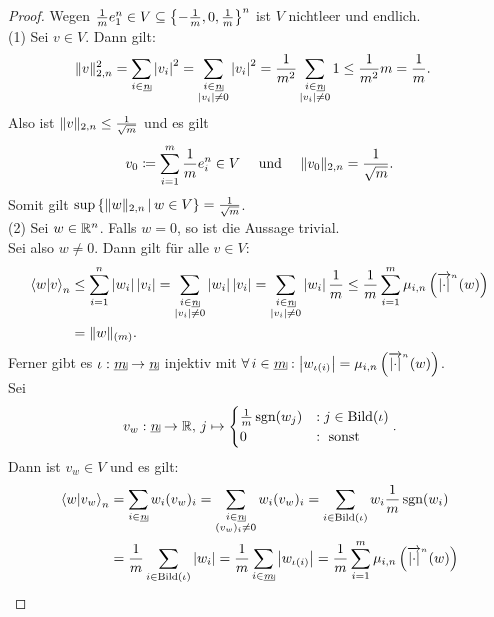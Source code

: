 \begin{proof}
Wegen $\frac 1 m e_1^n \in V \subseteq \left\{-\frac 1 m, 0, \frac 1 m\right\}^n$ ist
$V$ nichtleer und endlich.\\
(1) Sei $v \in V$. Dann gilt:
\begin{align*}
\norm v_{2, n}^2 &= \sum_{i \in \haken n}\abs{v_i}^2
= \sum_{\substack{i\in \haken n\\ \abs{v_i} \neq 0}} \abs{v_i}^2
= \frac 1 {m^2} \sum_{\substack{i\in \haken n\\ \abs{v_i} \neq 0}} 1
\le \frac 1 {m^2} m = \frac 1 m\text.
\end{align*}
Also ist $\lVert v\rVert _{2, n} \le\frac 1 {\sqrt m}$ und es gilt
\[v_0 \coloneqq  \sum_{i=1}^m \frac 1 m e_i^n \in V \quad \text{ und } \quad
\lVert v_0\rVert_{2, n} = \frac 1 {\sqrt m}\text.\]
Somit gilt $\sup\left\{\lVert w\rVert_{2, n}\,|\,w \in V\right\} = \frac 1 {\sqrt m}$.\\
(2) Sei $w \in \mathbb{R}^n$. Falls $w = 0$, so ist die Aussage trivial.\\
Sei also $w \neq 0$. Dann gilt für alle $v\in V$:
\begin{align*}\sprod w v_n& \le \sum_{i=1}^n \abs{w_i}\abs{v_i}
= \sum_{\substack{i \in \haken n\\ \abs{v_i} \neq 0} }\abs{w_i}\abs{v_i}
= \sum_{\substack{i \in \haken n\\ \abs{v_i} \neq 0} }\abs{w_i}\frac 1 m
\le \frac 1 m \sum_{i=1}^m \mu_{i, n}\left(\pfeil {\abs\cdot}n (w) \right)\\
&= \norm w_{(m)}\text.
\end{align*}
Ferner gibt es $\iota: \haken m \rightarrow \haken n$ injektiv mit
$\forall\, i \in \haken m: \abs{w_{\iota(i)}}
= \mu_{i, n}\left(\pfeil {\abs\cdot}n (w) \right)$.\\
Sei
\[v_w : \haken n \rightarrow \R,\, j \mapsto \begin{cases}
\frac 1 m \sgn(w_{j})&: j \in \Bild(\iota)\\
0 & : \text{ sonst}
\end{cases}.\]
Dann ist $v_w \in V$ und es gilt:
\begin{align*}
\sprod w {v_w}_n &= \sum_{i \in \haken n}w_i (v_w)_i
= \sum_{\substack{i \in \haken n\\ (v_w)_i \neq 0}}w_i (v_w)_i
= \sum_{i \in \Bild(\iota)}w_i \frac 1 m \sgn(w_i)\\
&= \frac 1 m\sum_{i \in \Bild(\iota)} \abs{w_i}
= \frac 1 m \sum_{i \in \haken m} \abs{w_{\iota(i)}}
= \frac 1 m \sum_{i=1}^m\mu_{i, n}\left(\pfeil {\abs\cdot}n (w) \right)

\end{align*}
\end{proof}

